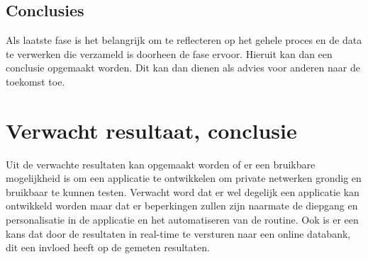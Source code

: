 \subsection{Conclusies}
\label{subsub:conclusies}

Als laatste fase is het belangrijk om te reflecteren op het gehele proces en de data te verwerken die verzameld is doorheen de fase ervoor. Hieruit kan dan een conclusie opgemaakt worden. Dit kan dan dienen als advies voor anderen naar de toekomst toe. 



\section{Verwacht resultaat, conclusie}%
\label{sec:verwachte_resultaten}

Uit de verwachte resultaten kan opgemaakt worden of er een bruikbare mogelijkheid is om een applicatie te ontwikkelen om private netwerken grondig en bruikbaar te kunnen testen. Verwacht word dat er wel degelijk een applicatie kan ontwikkeld worden maar dat er beperkingen zullen zijn naarmate de diepgang en personalisatie in de applicatie en het automatiseren van de routine. Ook is er een kans dat door de resultaten in real-time te versturen naar een online databank, dit een invloed heeft op de gemeten resultaten.
